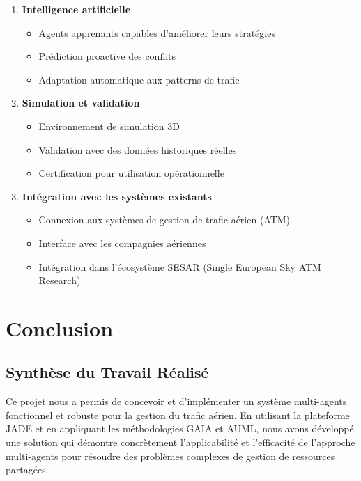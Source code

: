 \documentclass[12pt,a4paper]{article}
\begin{document}
\begin{enumerate}[leftmargin=*]
    \item \textbf{Intelligence artificielle}
    \begin{itemize}
        \item Agents apprenants capables d'améliorer leurs stratégies
        \item Prédiction proactive des conflits
        \item Adaptation automatique aux patterns de trafic
    \end{itemize}

    \item \textbf{Simulation et validation}
    \begin{itemize}
        \item Environnement de simulation 3D
        \item Validation avec des données historiques réelles
        \item Certification pour utilisation opérationnelle
    \end{itemize}

    \item \textbf{Intégration avec les systèmes existants}
    \begin{itemize}
        \item Connexion aux systèmes de gestion de trafic aérien (ATM)
        \item Interface avec les compagnies aériennes
        \item Intégration dans l'écosystème SESAR (Single European Sky ATM Research)
    \end{itemize}
\end{enumerate}

\section{Conclusion}

\subsection{Synthèse du Travail Réalisé}

Ce projet nous a permis de concevoir et d'implémenter un système multi-agents fonctionnel et robuste pour la gestion du trafic aérien. En utilisant la plateforme JADE et en appliquant les méthodologies GAIA et AUML, nous avons développé une solution qui démontre concrètement l'applicabilité et l'efficacité de l'approche multi-agents pour résoudre des problèmes complexes de gestion de ressources partagées.
\end{document}
